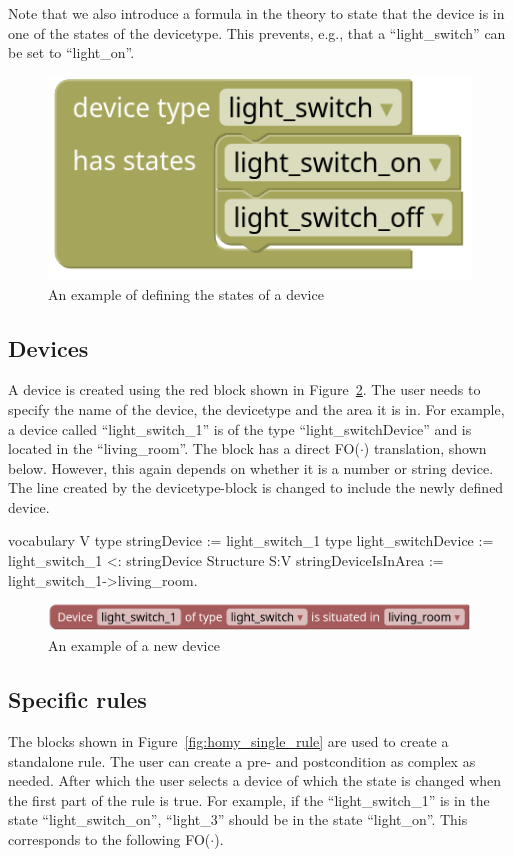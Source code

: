 \documentclass[11pt,a4paper]{report}
\newcommand{\fodot}{FO($\cdot$)\xspace}
\begin{document}
Note that we also introduce a formula in the theory to state that the device is in one of the states of the devicetype. This prevents, e.g., that a ``light\_switch'' can be set to ``light\_on''.

\begin{figure}
    \centering
    \includegraphics[width=0.4\linewidth]{images/homy_device_type.png}
    \caption{An example of defining the states of a device}
    \label{fig:homy_device_type}
\end{figure}

\subsection{Devices}
A device is created using the red block shown in Figure~\ref{fig:homy_device}. The user needs to specify the name of the device, the devicetype and the area it is in. For example, a device called ``light\_switch\_1'' is of the type ``light\_switchDevice'' and is located in the ``living\_room''. The block has a direct \fodot translation, shown below. However, this again depends on whether it is a number or string device. The line created by the devicetype-block is changed to include the newly defined device.

\begin{idplisting}
vocabulary V {
    type stringDevice := {light_switch_1} 
    type light_switchDevice := {light_switch_1} <: stringDevice
}
Structure S:V {
    stringDeviceIsInArea := {light_switch_1->living_room}.
}
\end{idplisting}

\begin{figure}
    \centering
    \includegraphics[width=0.8\linewidth]{images/homy_device.png}
    \caption{An example of a new device}
    \label{fig:homy_device}
\end{figure}

\subsection{Specific rules}
The blocks shown in Figure~\ref{fig:homy_single_rule} are used to create a standalone rule. The user can create a pre- and postcondition as complex as needed. After which the user selects a device of which the state is changed when the first part of the rule is true. For example, if the ``light\_switch\_1'' is in the state ``light\_switch\_on'', ``light\_3'' should be in the state ``light\_on''. This corresponds to the following \fodot.
\end{document}
